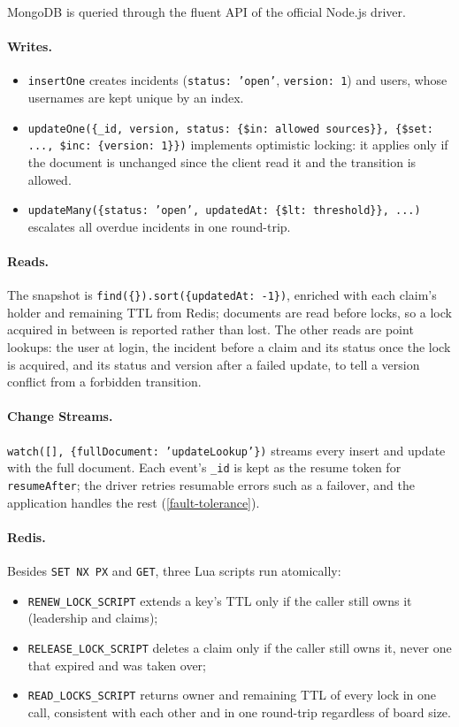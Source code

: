 \documentclass{scrartcl}
\begin{document}
MongoDB is queried through the fluent API of the official Node.js driver.

\paragraph{Writes.}
%
\begin{itemize}
  \item \texttt{insertOne} creates incidents (\texttt{status: 'open'}, \texttt{version: 1}) and users, whose usernames are kept unique by an index.
  \item \texttt{updateOne(\{\_id, version, status: \{\$in: allowed sources\}\}, \{\$set: ..., \$inc: \{version: 1\}\})} implements optimistic locking: it applies only if the document is unchanged since the client read it and the transition is allowed.
  \item \texttt{updateMany(\{status: 'open', updatedAt: \{\$lt: threshold\}\}, ...)} escalates all overdue incidents in one round-trip.
\end{itemize}

\paragraph{Reads.} The snapshot is \texttt{find(\{\}).sort(\{updatedAt: -1\})}, enriched with each claim's holder and remaining TTL from Redis; documents are read before locks, so a lock acquired in between is reported rather than lost. The other reads are point lookups: the user at login, the incident before a claim and its status once the lock is acquired, and its status and version after a failed update, to tell a version conflict from a forbidden transition.

\paragraph{Change Streams.} \texttt{watch([], \{fullDocument: 'updateLookup'\})} streams every insert and update with the full document. Each event's \texttt{\_id} is kept as the resume token for \texttt{resumeAfter}; the driver retries resumable errors such as a failover, and the application handles the rest (\cref{fault-tolerance}).

\paragraph{Redis.} Besides \texttt{SET NX PX} and \texttt{GET}, three Lua scripts run atomically:
%
\begin{itemize}
  \item \texttt{RENEW\_LOCK\_SCRIPT} extends a key's TTL only if the caller still owns it (leadership and claims);
  \item \texttt{RELEASE\_LOCK\_SCRIPT} deletes a claim only if the caller still owns it, never one that expired and was taken over;
  \item \texttt{READ\_LOCKS\_SCRIPT} returns owner and remaining TTL of every lock in one call, consistent with each other and in one round-trip regardless of board size.
\end{itemize}
\end{document}
